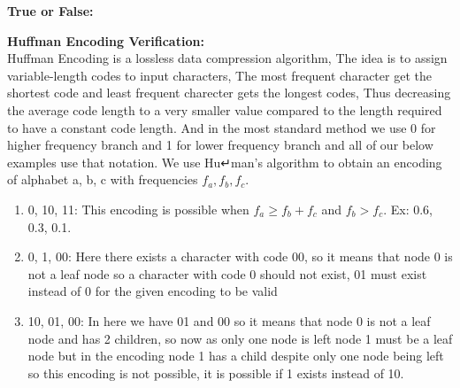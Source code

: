 \item\textbf{True or False:}
	\begin{enumerate}
	\end{enumerate}

\item \textbf{Huffman Encoding Verification:}\\
	Huffman Encoding is a lossless data compression algorithm, The idea is to assign variable-length codes to input characters, The most frequent character get the shortest code and least frequent charecter gets the longest codes, Thus decreasing the average code length to a very smaller value compared to the length required to have a constant code length. And in the most standard method we use 0 for higher frequency branch and 1 for lower frequency branch and all of our below examples use that notation. We use Hu↵man’s algorithm to obtain an encoding of alphabet {a, b, c} with frequencies $f_a, f_b, f_c$.
	\begin{enumerate}
		\item {0, 10, 11}: This encoding is possible when $f_a \geq f_b + f_c$ and  $f_b > f_c$. Ex: {0.6, 0.3, 0.1}.
		\item {0, 1, 00}: Here there exists a character with code 00, so it means that node 0 is not a leaf node so a character with code 0 should not exist, 01 must exist instead of 0 for the given encoding to be valid
		\item {10, 01, 00}: In here we have 01 and 00 so it means that node 0 is not a leaf node and has 2 children, so now as only one node is left node 1 must be a leaf node but in the encoding node 1 has a child despite only one node being left so this encoding is not possible, it is possible if 1 exists instead of 10.
	\end{enumerate}

\item \textbf{}


